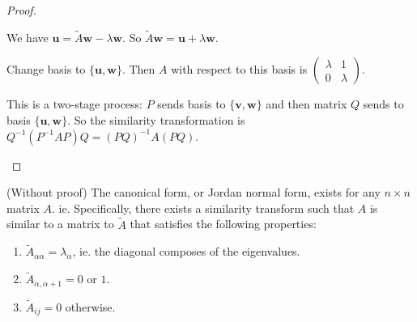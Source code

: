 \documentclass[a4paper]{article}
\begin{document}
\begin{proof}
\begin{enumerate}
        We have $\mathbf{u} = \tilde A\mathbf{w} - \lambda\mathbf{w}$. So $\tilde A\mathbf{w} = \mathbf{u} + \lambda\mathbf{w}$. 

        Change basis to $\{\mathbf{u}, \mathbf{w}\}$. Then $A$ with respect to this basis is $
        \begin{pmatrix}
          \lambda & 1\\
          0 & \lambda
        \end{pmatrix}$.

        This is a two-stage process: $P$ sends basis to $\{\mathbf{v}, \mathbf{w}\}$ and then matrix $Q$ sends to basis $\{\mathbf{u}, \mathbf{w}\}$. So the similarity transformation is $Q^{-1}(P^{-1}AP)Q = (PQ)^{-1}A(PQ)$.
    \end{enumerate}
  \end{proof}

  \begin{prop}
    (Without proof) The canonical form, or Jordan normal form, exists for any $n\times n$ matrix $A$. ie. Specifically, there exists a similarity transform such that $A$ is similar to a matrix to $\tilde{A}$ that satisfies the following properties:
    \begin{enumerate}
      \item $\tilde{A}_{\alpha\alpha} = \lambda_\alpha$, ie. the diagonal composes of the eigenvalues.
      \item $\tilde{A}_{\alpha, \alpha + 1} = 0$ or $1$.
      \item $\tilde{A}_{ij} = 0$ otherwise.
    \end{enumerate}
  \end{prop}
\end{document}

